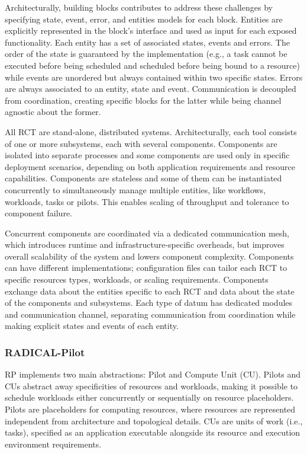 \documentclass[preprint,12pt, a4paper]{elsarticle}
\begin{document}
Architecturally, building blocks contributes to address these challenges by
specifying state, event, error, and entities models for each block. Entities
are explicitly represented in the block's interface and used as input for
each exposed functionality. Each entity has a set of associated states,
events and errors. The order of the state is guaranteed by the implementation
(e.g., a task cannot be executed before being scheduled and scheduled before
being bound to a resource) while events are unordered but always contained
within two specific states. Errors are always associated to an entity, state
and event. Communication is decoupled from coordination, creating specific
blocks for the latter while being channel agnostic about the former.

All RCT are stand-alone, distributed systems. Architecturally, each tool
consists of one or more subsystems, each with several components. Components
are isolated into separate processes and some components are used only in
specific deployment scenarios, depending on both application requirements and
resource capabilities. Components are stateless and some of them can be
instantiated concurrently to simultaneously manage multiple entities, like
workflows, workloads, tasks or pilots. This enables scaling of throughput and
tolerance to component failure.

Concurrent components are coordinated via a dedicated communication mesh,
which introduces runtime and infrastructure-specific overheads, but improves
overall scalability of the system and lowers component complexity. Components
can have different implementations; configuration files can tailor each RCT
to specific resources types, workloads, or scaling requirements. Components
exchange data about the entities specific to each RCT and data about the
state of the components and subsystems. Each type of datum has dedicated
modules and communication channel, separating communication from coordination
while making explicit states and events of each entity.

\subsubsection{RADICAL-Pilot}\label{sssec:arch_rp}

RP implements two main abstractions: Pilot and Compute Unit (CU). Pilots and
CUs abstract away specificities of resources and workloads, making it
possible to schedule workloads either concurrently or sequentially on
resource placeholders. Pilots are placeholders for computing resources, where
resources are represented independent from architecture and topological
details. CUs are units of work (i.e., tasks), specified as an application
executable alongside its resource and execution environment requirements.
\end{document}
